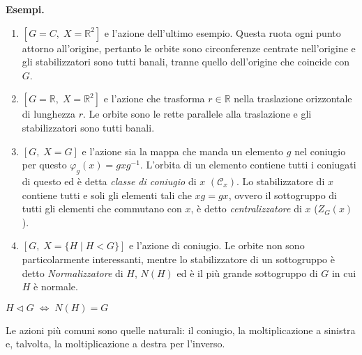\begin{multicols}{2}
\textbf{Esempi.}
\begin{enumerate}
	\item $ [G = C,\; X = \mathbb{R}^2 ] $ e l'azione dell'ultimo esempio. Questa ruota ogni punto attorno all'origine, pertanto le orbite sono circonferenze centrate nell'origine e gli stabilizzatori sono tutti banali, tranne quello dell'origine che coincide con $ G $.
	\item $ [G = \mathbb{R},\; X = \mathbb{R}^2 ] $ e l'azione che trasforma $ r \in \mathbb{R} $ nella traslazione orizzontale di lunghezza $ r $. Le orbite sono le rette parallele alla traslazione e gli stabilizzatori sono tutti banali.
	\item $ [G,\; X = G ] $ e l'azione sia la mappa che manda un elemento $ g $ nel coniugio per questo $ \varphi_g(x) = gxg^{-1} $. L'orbita di un elemento contiene tutti i coniugati di questo ed è detta \emph{classe di coniugio} di $ x $ $ (\mathcal{C}_x) $. Lo stabilizzatore di $ x $ contiene tutti e soli gli elementi tali che $ xg = gx $, ovvero il sottogruppo di tutti gli elementi che commutano con $ x $, è detto \emph{centralizzatore} di $ x $ ($ Z_G(x) $).
	\item $ [G,\; X = \{ H \mid H < G \} ] $ e l'azione di coniugio. Le orbite non sono particolarmente interessanti, mentre lo stabilizzatore di un sottogruppo è detto \emph{Normalizzatore} di $ H $, $ N(H) $ ed è il più grande sottogruppo di $ G $ in cui $ H $ è normale.
\end{enumerate}
\begin{remark}
	$ H \lhd G \;\Leftrightarrow\; N(H) = G $
\end{remark}
\begin{remark}[euristica]
	Le azioni più comuni sono quelle naturali: il coniugio, la moltiplicazione a sinistra e, talvolta, la moltiplicazione a destra per l'inverso.
\end{remark}
\end{multicols}

